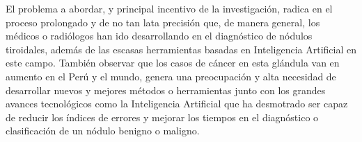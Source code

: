 El problema a abordar, y principal incentivo de la investigación, radica en el proceso prolongado y de no tan lata precisión que, de manera general, los médicos o radiólogos han ido desarrollando en el diagnóstico de nódulos tiroidales, además de las escasas herramientas basadas en Inteligencia Artificial en este campo. También observar que los casos de cáncer en esta glándula van en aumento en el Perú y el mundo, genera una preocupación y alta necesidad de desarrollar nuevos y mejores métodos o herramientas junto con los grandes avances tecnológicos como la Inteligencia Artificial que ha desmotrado ser capaz de reducir los índices de errores y mejorar los tiempos en el diagnóstico o clasificación de un nódulo benigno o maligno.
